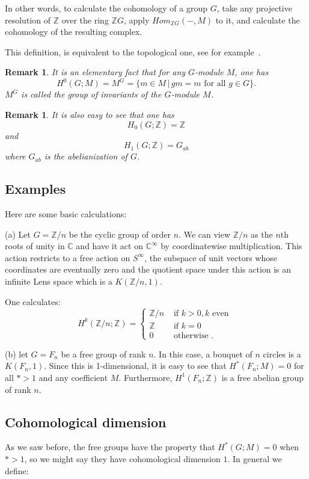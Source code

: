 \documentclass{amsart}
\newtheorem{rem}[thm]{Remark}
\begin{document}
In other words, to calculate the cohomology of a group $G$, take any
 projective resolution of $\mathbb{Z}$ over the ring $\mathbb{Z}G$, 
apply $Hom_{\mathbb{Z}G}(-,M)$ to it, and calculate the cohomology of the resulting complex.

This definition, is equivalent to the topological one, see for 
example~\cite{Brown}.

\begin{rem}
It is an elementary fact that for any $G$-module $M$, one has
$$
H^0(G;M)=M^G=\{m \in M \, | \, gm=m \text{ for all } g \in G \}.
$$
$M^G$ is called the group of invariants of the $G$-module $M$.
\end{rem}

\begin{rem}
It is also easy to see that one has
$$
H_0(G;\mathbb{Z})=\mathbb{Z}$$
and
$$
H_1(G;\mathbb{Z})=G_{ab}
$$
where $G_{ab}$ is the abelianization of $G$.
\end{rem}

\subsection{Examples}
Here are some basic calculations:

\noindent
(a) Let $G=\mathbb{Z}/n$ be the cyclic group of order $n$. 
We can view $\mathbb{Z}/n$ as the $n$th
roots of unity in $\mathbb{C}$ and have it act on $\mathbb{C}^\infty$ by
coordinatewise multiplication. This action restricts to a free action on
 $S^\infty$, the
subspace of unit vectors whose coordinates are eventually zero and the
quotient space under this action is an infinite Lens space which is a
$K(\mathbb{Z}/n,1)$.
 
One calculates:
$$
H^k(\mathbb{Z}/n;\mathbb{Z}) = 
\begin{cases}
\mathbb{Z}/n &\text{ if } k > 0 , k \text{ even } \\
\mathbb{Z}   &\text{ if } k=0 \\
0 &\text{ otherwise }.
\end{cases}
$$ 

\noindent
(b) let $G=F_n$ be a free group of rank $n$.
In this case, a bouquet of $n$ circles is a $K(F_n,1)$. Since this is 
1-dimensional, it is easy
to see that $H^*(F_n;M)=0$ for all $* > 1$ and any coefficient $M$.
Furthermore, $H^1(F_n;\mathbb{Z})$ is a free abelian group of rank $n$.

\subsection{Cohomological dimension}
As we saw before, the free groups have the property
that $H^*(G;M)=0$ when $*>1$, so we might say they have cohomological dimension
$1$. In general we define:
\end{document}
